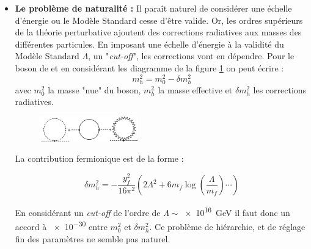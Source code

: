 \begin{itemize}[label=$\bullet$]
\item \textbf{Le problème de naturalité :} Il paraît naturel de considérer une échelle d'énergie ou le Modèle Standard cesse d'être valide. Or, les ordres supérieurs de la théorie perturbative ajoutent des corrections radiatives aux masses des différentes particules. En imposant une échelle d'énergie à la validité du Modèle Standard $\Lambda$, un "\textit{cut-off}", les corrections vont en dépendre. Pour le boson de  et en considérant les diagramme de la figure \ref{corrections} on peut écrire :
\begin{equation}
m_{h}^{2}=m_{0}^{2}-\delta m_{h}^{2}
\end{equation}
avec $m_{0}^{2}$ la masse "nue" du boson, $m_{h}^{2}$ la masse effective et $\delta m_{h}^{2}$ les corrections radiatives.

\begin{figure}[ht!]
\centering
\includegraphics[width=0.40\textwidth]{SM/corrections.jpg}
\label{corrections}
\end{figure}

La contribution fermionique est de la forme :

\begin{equation}
\label{eq1}
\delta m_{h}^{2}=-\frac{y_{f}^{2}}{16\pi^{2}}\left(2\Lambda^{2}+6m_{f}\log\left(\frac{\Lambda}{m_{f}}\right)\cdots\right)
\end{equation}

En considérant un \textit{cut-off} de l'ordre de $\Lambda \sim$\SI{e16}{\giga\eV} il faut donc un accord à \num{e-30} entre $m_{0}^{2}$ et $\delta m_{h}^{2}$. Ce problème de hiérarchie, et de réglage fin des paramètres ne semble pas naturel.


\end{itemize}
